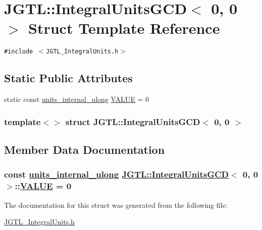 \hypertarget{struct_j_g_t_l_1_1_integral_units_g_c_d_3_010_00_010_01_4}{
\section{JGTL::Integral\-Units\-GCD$<$ 0, 0 $>$ Struct Template Reference}
\label{struct_j_g_t_l_1_1_integral_units_g_c_d_3_010_00_010_01_4}
}
{\tt \#include $<$JGTL\_\-Integral\-Units.h$>$}

\subsection*{Static Public Attributes}
\begin{CompactItemize}
\item 
static const \hyperlink{namespace_j_g_t_l_1924d6fd42e2d9661bc0b5a5063b99b3}{units\_\-internal\_\-ulong} \hyperlink{struct_j_g_t_l_1_1_integral_units_g_c_d_3_010_00_010_01_4_bf43633dc7cfc1480ea337375ee1fea8}{VALUE} = 0
\end{CompactItemize}
\subsubsection*{template$<$$>$ struct JGTL::Integral\-Units\-GCD$<$ 0, 0 $>$}



\subsection{Member Data Documentation}
\hypertarget{struct_j_g_t_l_1_1_integral_units_g_c_d_3_010_00_010_01_4_bf43633dc7cfc1480ea337375ee1fea8}{
\subsubsection[VALUE]{\setlength{\rightskip}{0pt plus 5cm}const \hyperlink{namespace_j_g_t_l_1924d6fd42e2d9661bc0b5a5063b99b3}{units\_\-internal\_\-ulong} \hyperlink{struct_j_g_t_l_1_1_integral_units_g_c_d}{JGTL::Integral\-Units\-GCD}$<$ 0, 0 $>$::\hyperlink{struct_j_g_t_l_1_1_integral_units_g_c_d_3_010_00_010_01_4_bf43633dc7cfc1480ea337375ee1fea8}{VALUE} = 0}}
\label{struct_j_g_t_l_1_1_integral_units_g_c_d_3_010_00_010_01_4_bf43633dc7cfc1480ea337375ee1fea8}




The documentation for this struct was generated from the following file:\begin{CompactItemize}
\item 
\hyperlink{_j_g_t_l___integral_units_8h}{JGTL\_\-Integral\-Units.h}\end{CompactItemize}
